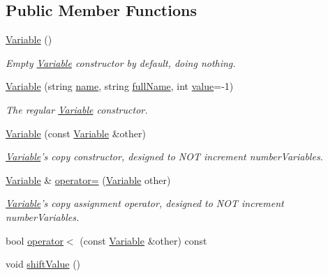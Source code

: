 \subsection*{Public Member Functions}
\begin{DoxyCompactItemize}
\item 
\hyperlink{classghost_1_1Variable_a50678691d071f5dcf3a8e60be06e2a71}{Variable} ()
\begin{DoxyCompactList}\small\item\em Empty \hyperlink{classghost_1_1Variable}{Variable} constructor by default, doing nothing. \end{DoxyCompactList}\item 
\hyperlink{classghost_1_1Variable_ad6050d933bf7a3ea6403d9928633a719}{Variable} (string \hyperlink{classghost_1_1Variable_a05cf4a4cd3a5c033028e0b0f11d1dafd}{name}, string \hyperlink{classghost_1_1Variable_a87dc1fa73726f887a7ecbd5b9bfa7cab}{full\-Name}, int \hyperlink{classghost_1_1Variable_a4623be8dd7ed2a0cb7033aec42033cb7}{value}=-\/1)
\begin{DoxyCompactList}\small\item\em The regular \hyperlink{classghost_1_1Variable}{Variable} constructor. \end{DoxyCompactList}\item 
\hyperlink{classghost_1_1Variable_ac9fb0513e1d15a047816821e034589ea}{Variable} (const \hyperlink{classghost_1_1Variable}{Variable} \&other)
\begin{DoxyCompactList}\small\item\em \hyperlink{classghost_1_1Variable}{Variable}'s copy constructor, designed to N\-O\-T increment number\-Variables. \end{DoxyCompactList}\item 
\hyperlink{classghost_1_1Variable}{Variable} \& \hyperlink{classghost_1_1Variable_ad82b892892c3531cc3d54d6b5d048bf6}{operator=} (\hyperlink{classghost_1_1Variable}{Variable} other)
\begin{DoxyCompactList}\small\item\em \hyperlink{classghost_1_1Variable}{Variable}'s copy assignment operator, designed to N\-O\-T increment number\-Variables. \end{DoxyCompactList}\item 
bool \hyperlink{classghost_1_1Variable_aeea921ab89e0f175037ce8c81845905c}{operator$<$} (const \hyperlink{classghost_1_1Variable}{Variable} \&other) const 
\item 
void \hyperlink{classghost_1_1Variable_a8afe14b1858476bf4ef59a41a2947f93}{shift\-Value} ()

\end{DoxyCompactItemize}
